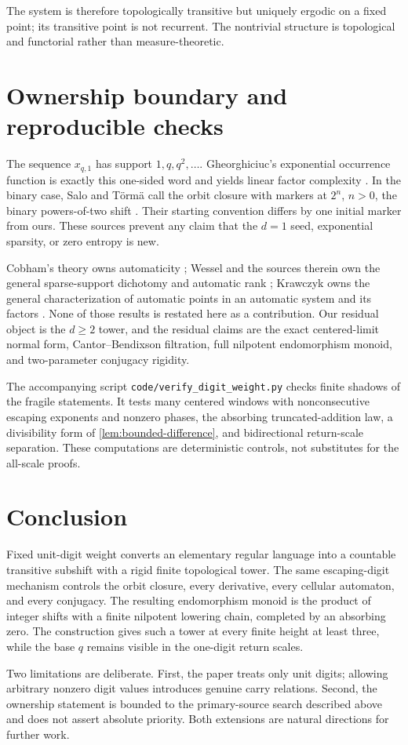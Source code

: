\documentclass[11pt,a4paper]{amsart}
\theoremstyle{definition}
\theoremstyle{remark}
\begin{document}
The system is therefore topologically transitive but uniquely ergodic on a
fixed point; its transitive point is not recurrent.  The nontrivial structure
is topological and functorial rather than measure-theoretic.

\section{Ownership boundary and reproducible checks}

The sequence $x_{q,1}$ has support $1,q,q^2,\ldots$.  Gheorghiciuc's
exponential occurrence function is exactly this one-sided word and yields
linear factor complexity \cite{Gheorghiciuc2007}.  In the binary case,
Salo and T\"orm\"a call the orbit closure with markers at $2^n$, $n>0$, the
binary powers-of-two shift \cite{SaloTorma2012}.  Their starting convention
differs by one initial marker from ours.  These sources prevent any claim
that the $d=1$ seed, exponential sparsity, or zero entropy is new.

Cobham's theory owns automaticity \cite{Cobham1972}; Wessel and the sources
therein own the general sparse-support dichotomy and automatic rank
\cite{Wessel2025}; Krawczyk owns the general characterization of automatic
points in an automatic system and its factors \cite{Krawczyk2026}.  None of
those results is restated here as a contribution.  Our residual object is
the $d\geq2$ tower, and the residual claims are the exact centered-limit
normal form, Cantor--Bendixson filtration, full nilpotent endomorphism monoid,
and two-parameter conjugacy rigidity.

The accompanying script \texttt{code/verify\_digit\_weight.py} checks finite
shadows of the fragile statements.  It tests many centered windows with
nonconsecutive escaping exponents and nonzero phases, the absorbing
truncated-addition law, a divisibility form of
\cref{lem:bounded-difference}, and bidirectional return-scale separation.
These computations are deterministic controls, not substitutes for the
all-scale proofs.

\section{Conclusion}

Fixed unit-digit weight converts an elementary regular language into a
countable transitive subshift with a rigid finite topological tower.  The
same escaping-digit mechanism controls the orbit closure, every derivative,
every cellular automaton, and every conjugacy.  The resulting endomorphism
monoid is the product of integer shifts with a finite nilpotent lowering
chain, completed by an absorbing zero.  The construction gives such a tower
at every finite height at least three, while the base $q$ remains visible in
the one-digit return scales.

Two limitations are deliberate.  First, the paper treats only unit digits;
allowing arbitrary nonzero digit values introduces genuine carry relations.
Second, the ownership statement is bounded to the primary-source search
described above and does not assert absolute priority.  Both extensions are
natural directions for further work.



\end{document}
